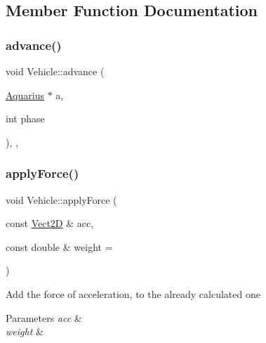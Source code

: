 \subsection{Member Function Documentation}
\mbox{\label{classVehicle_aa4ffd7e5fd11297950347de4e8b5ec93_aa4ffd7e5fd11297950347de4e8b5ec93}} 
\subsubsection{\texorpdfstring{advance()}{advance()}}
{\footnotesize\ttfamily void Vehicle\+::advance (\begin{DoxyParamCaption}\item[{\hyperlink{classAquarius}{Aquarius} $\ast$}]{a,  }\item[{int}]{phase }\end{DoxyParamCaption})\hspace{0.3cm}{\ttfamily [final]}, {\ttfamily [virtual]}, {\ttfamily [inherited]}}

\mbox{\label{classVehicle_a82fbbd5aafc1ba89c3daa4da09989bbe_a82fbbd5aafc1ba89c3daa4da09989bbe}} 
\subsubsection{\texorpdfstring{apply\+Force()}{applyForce()}}
{\footnotesize\ttfamily void Vehicle\+::apply\+Force (\begin{DoxyParamCaption}\item[{const \hyperlink{classVect2D}{Vect2D} \&}]{acc,  }\item[{const double \&}]{weight = {} }\end{DoxyParamCaption})\hspace{0.3cm}{\ttfamily [inherited]}}

Add the force of acceleration, to the already calculated one 
\begin{DoxyParams}{Parameters}
{\em acc} & \\
\hline
{\em weight} & \\
\hline
\end{DoxyParams}
\mbox{\label{classVehicle_a55f8bb6cfbdd97219c2cea6cf3ad3826_a55f8bb6cfbdd97219c2cea6cf3ad3826}} 
